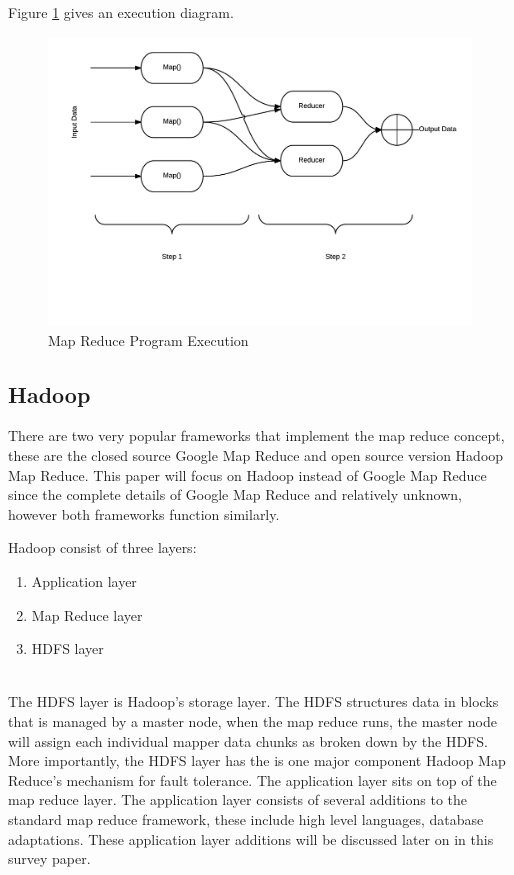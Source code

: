 \documentclass[10pt,twocolumn]{IEEEtran11}
\begin{document}
Figure \ref{fig:mapReduce} gives an execution diagram.
\begin{figure}[h]
\centering
\includegraphics[scale=0.50]{images/mapReduce.png}
\caption{Map Reduce Program Execution}
\label{fig:mapReduce}
\end{figure}

\subsection{Hadoop}
There are two very popular frameworks that implement the map reduce concept, these are the closed source Google Map Reduce and open source version Hadoop Map Reduce.  
This paper will focus on Hadoop instead of Google Map Reduce since the complete details of Google Map Reduce and relatively unknown, however both frameworks function similarly.
\par
Hadoop consist of three layers:
\  \\
\begin{enumerate}
	\setlength\itemsep{1em}
	\item Application layer
	\item Map Reduce layer
	\item HDFS layer
\end{enumerate} 
\  \\
The HDFS layer is Hadoop's storage layer.  The HDFS structures data in blocks that is managed by a master node, when the map reduce runs, the master node will assign each individual mapper data chunks as broken down by the HDFS.  More importantly, the HDFS layer has the is one major component Hadoop Map Reduce's mechanism for
fault tolerance.  The application layer sits on top of the map reduce layer.  The application layer consists of several additions to the standard map reduce framework, these include high level languages, database adaptations.  These application layer additions will be discussed later on in this survey paper.
\end{document}
